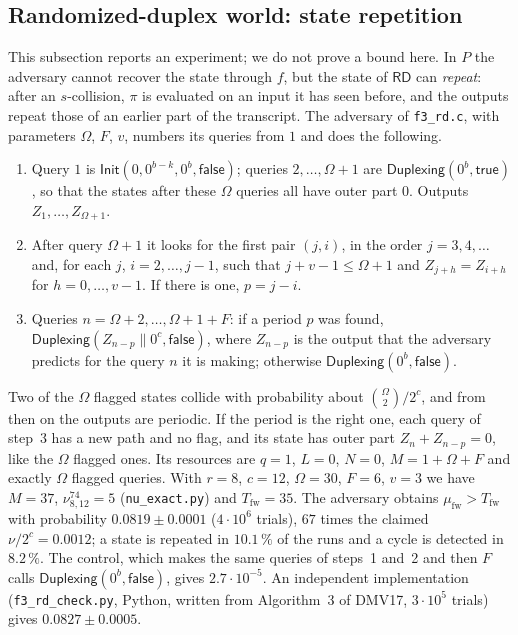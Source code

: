 \documentclass[11pt,a4paper]{article}
\theoremstyle{definition}
\theoremstyle{remark}
\newcommand{\RD}{\mathsf{RD}}
\newcommand{\true}{\mathsf{true}}
\newcommand{\false}{\mathsf{false}}
\newcommand{\mufw}{\mu_{\mathrm{fw}}}
\newcommand{\Tfw}{T_{\mathrm{fw}}}
\newcommand{\file}[1]{\texttt{#1}}
\begin{document}
\subsection{Randomized-duplex world: state repetition}
This subsection reports an experiment; we do not prove a bound here.
In $P$ the adversary cannot recover the state through $f$, but the state of $\RD$ can \emph{repeat}: after an
$s$-collision, $\pi$ is evaluated on an input it has seen before, and the outputs repeat those of an earlier part of
the transcript. The adversary of \file{f3\_rd.c}, with parameters $\Omega$, $F$, $v$, numbers its queries from $1$ and does
the following.
\begin{enumerate}[leftmargin=*,itemsep=1pt]
\item Query $1$ is $\mathsf{Init}(0, 0^{b-k}, 0^b, \false)$; queries $2, \dots, \Omega + 1$ are $\mathsf{Duplexing}(0^b, \true)$, so that the
states after these $\Omega$ queries all have outer part $0$. Outputs $Z_1, \dots, Z_{\Omega+1}$.
\item After query $\Omega + 1$ it looks for the first pair $(j, i)$, in the order $j = 3, 4, \dots$ and, for each $j$,
$i = 2, \dots, j - 1$, such that $j + v - 1 \le \Omega + 1$ and $Z_{j+h} = Z_{i+h}$ for $h = 0, \dots, v - 1$. If there is one, $p = j - i$.
\item Queries $n = \Omega + 2, \dots, \Omega + 1 + F$: if a period $p$ was found, $\mathsf{Duplexing}(Z_{n-p} \| 0^c, \false)$, where $Z_{n-p}$
is the output that the adversary predicts for the query $n$ it is making; otherwise $\mathsf{Duplexing}(0^b, \false)$.
\end{enumerate}
Two of the $\Omega$ flagged states collide with probability about $\binom{\Omega}{2}/2^c$, and from then on the outputs are
periodic. If the period is the right one, each query of step~3 has a new path and no flag, and its state has outer
part $Z_n + Z_{n-p} = 0$, like the $\Omega$ flagged ones. Its resources are $q = 1$, $L = 0$, $N = 0$, $M = 1 + \Omega + F$ and
exactly $\Omega$ flagged queries. With $r = 8$, $c = 12$, $\Omega = 30$, $F = 6$, $v = 3$ we have $M = 37$,
$\nu^{74}_{8,12} = 5$ (\file{nu\_exact.py}) and $\Tfw = 35$.
The adversary obtains $\mufw > \Tfw$ with probability $0.0819 \pm 0.0001$ ($4 \cdot 10^6$ trials), $67$ times the claimed
$\nu/2^c = 0.0012$; a state is repeated in $10.1\,\%$ of the runs and a cycle is detected in $8.2\,\%$. The control, which
makes the same queries of steps~1 and~2 and then $F$ calls $\mathsf{Duplexing}(0^b, \false)$, gives $2.7 \cdot 10^{-5}$. An independent
implementation (\file{f3\_rd\_check.py}, Python, written from Algorithm~3 of DMV17, $3 \cdot 10^5$ trials) gives $0.0827 \pm 0.0005$.
\end{document}
